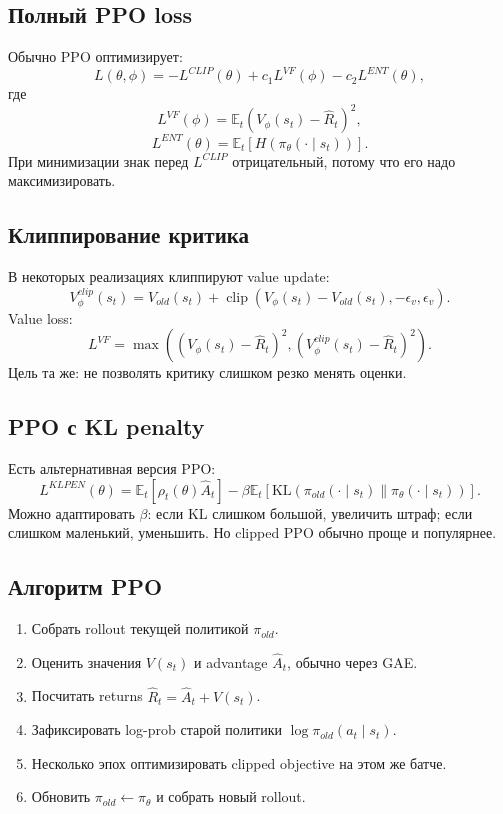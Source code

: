 \documentclass[11pt,a4paper]{article}
\newcommand{\E}{\mathbb{E}}
\newcommand{\KL}{\mathrm{KL}}
\newcommand{\clip}{\operatorname{clip}}
\newcommand{\1}{\mathbf{1}}
\begin{document}
\subsection*{Полный PPO loss}
Обычно PPO оптимизирует:
\[
    L(\theta,\phi)= -L^{CLIP}(\theta)+c_1L^{VF}(\phi)-c_2L^{ENT}(\theta),
\]
где
\[
    L^{VF}(\phi)=\E_t\left(V_\phi(s_t)-\hat R_t\right)^2,
\]
\[
    L^{ENT}(\theta)=\E_t\left[H(\pi_\theta(\cdot\mid s_t))\right].
\]
При минимизации знак перед $L^{CLIP}$ отрицательный, потому что его надо максимизировать.

\subsection*{Клиппирование критика}
В некоторых реализациях клиппируют value update:
\[
    V_{\phi}^{clip}(s_t)=V_{old}(s_t)+\clip(V_\phi(s_t)-V_{old}(s_t),-\epsilon_v,\epsilon_v).
\]
Value loss:
\[
    L^{VF}=\max\left(
    (V_\phi(s_t)-\hat R_t)^2,
    (V_\phi^{clip}(s_t)-\hat R_t)^2
    \right).
\]
Цель та же: не позволять критику слишком резко менять оценки.

\subsection*{PPO с KL penalty}
Есть альтернативная версия PPO:
\[
    L^{KLPEN}(\theta)=\E_t[\rho_t(\theta)\hat A_t]
    -\beta\E_t\left[\KL(\pi_{old}(\cdot\mid s_t)\|\pi_\theta(\cdot\mid s_t))\right].
\]
Можно адаптировать $\beta$: если KL слишком большой, увеличить штраф; если слишком маленький, уменьшить. Но clipped PPO обычно проще и популярнее.

\subsection*{Алгоритм PPO}
\begin{enumerate}
    \item Собрать rollout текущей политикой $\pi_{old}$.
    \item Оценить значения $V(s_t)$ и advantage $\hat A_t$, обычно через GAE.
    \item Посчитать returns $\hat R_t=\hat A_t+V(s_t)$.
    \item Зафиксировать log-prob старой политики $\log\pi_{old}(a_t\mid s_t)$.
    \item Несколько эпох оптимизировать clipped objective на этом же батче.
    \item Обновить $\pi_{old}\leftarrow\pi_\theta$ и собрать новый rollout.
\end{enumerate}
\end{document}
